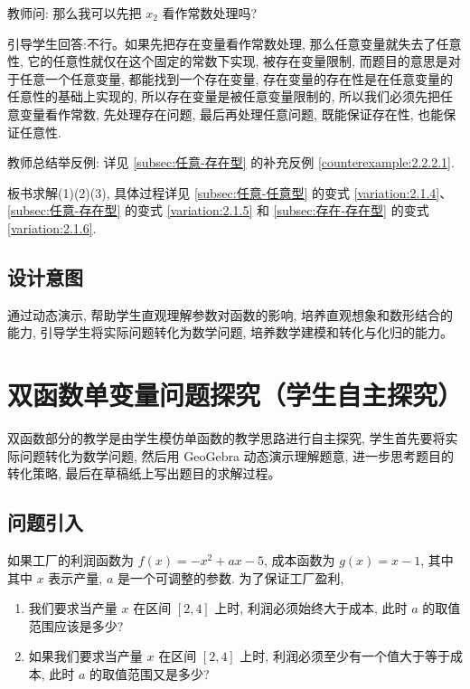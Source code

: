 教师问: 那么我可以先把 \({x}_{2}\) 看作常数处理吗?

引导学生回答:不行。如果先把存在变量看作常数处理, 那么任意变量就失去了任意性, 它的任意性就仅在这个固定的常数下实现, 被存在变量限制, 而题目的意思是对于任意一个任意变量, 都能找到一个存在变量, 存在变量的存在性是在任意变量的任意性的基础上实现的, 所以存在变量是被任意变量限制的, 所以我们必须先把任意变量看作常数, 先处理存在问题, 最后再处理任意问题, 既能保证存在性, 也能保证任意性.

教师总结举反例: 详见 \ref{subsec:任意-存在型} 的补充反例 \ref{counterexample:2.2.2.1}.

板书求解(1)(2)(3), 具体过程详见 \ref{subsec:任意-任意型} 的变式 \ref{variation:2.1.4}、\ref{subsec:任意-存在型} 的变式 \ref{variation:2.1.5} 和 \ref{subsec:存在-存在型} 的变式 \ref{variation:2.1.6}.


\subsection{设计意图}
通过动态演示, 帮助学生直观理解参数对函数的影响, 培养直观想象和数形结合的能力, 引导学生将实际问题转化为数学问题, 培养数学建模和转化与化归的能力。


\section{双函数单变量问题探究（学生自主探究）}
双函数部分的教学是由学生模仿单函数的教学思路进行自主探究, 学生首先要将实际问题转化为数学问题, 然后用 GeoGebra 动态演示理解题意, 进一步思考题目的转化策略, 最后在草稿纸上写出题目的求解过程。

\subsection{问题引入}
如果工厂的利润函数为 \(f(x)  =  - {x}^{2} + {ax} - 5\), 成本函数为 \(g(x)  = x - 1\), 其中其中 \(x\) 表示产量, \(a\) 是一个可调整的参数. 为了保证工厂盈利, 

\begin{enumerate}[(1)]
  \item 我们要求当产量 \(x\) 在区间 \(\left\lbrack  {2, 4}\right\rbrack\) 上时, 利润必须始终大于成本, 此时 \(a\) 的取值范围应该是多少?

  \item 如果我们要求当产量 \(x\) 在区间 \(\left\lbrack  {2, 4}\right\rbrack\) 上时, 利润必须至少有一个值大于等于成本, 此时 \(a\) 的取值范围又是多少?
\end{enumerate}

